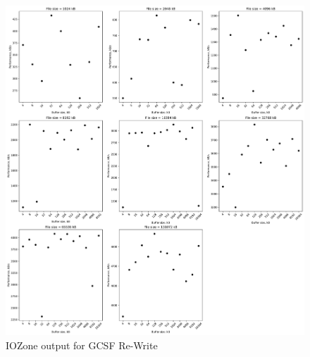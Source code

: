 \begin{figure}[!htb]
	\label{fig:bench_gcsf_re_write}
	\begin{center}
		\includegraphics[width=1.0\textwidth]{figures/benchmarking/gcsf/Re-Write.pdf}
	\end{center}
	\caption{IOZone output for GCSF \mbox{Re-Write}}
\end{figure}

